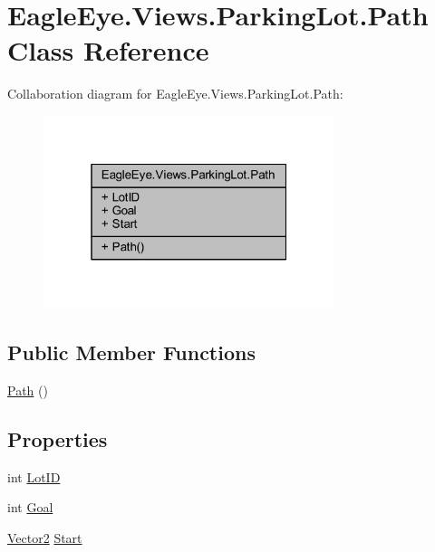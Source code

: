 \hypertarget{class_eagle_eye_1_1_views_1_1_parking_lot_1_1_path}{}\section{Eagle\+Eye.\+Views.\+Parking\+Lot.\+Path Class Reference}
\label{class_eagle_eye_1_1_views_1_1_parking_lot_1_1_path}


Collaboration diagram for Eagle\+Eye.\+Views.\+Parking\+Lot.\+Path\+:\nopagebreak
\begin{figure}[H]
\begin{center}
\leavevmode
\includegraphics[width=241pt]{class_eagle_eye_1_1_views_1_1_parking_lot_1_1_path__coll__graph}
\end{center}
\end{figure}
\subsection*{Public Member Functions}
\begin{DoxyCompactItemize}
\item 
\mbox{\hyperlink{class_eagle_eye_1_1_views_1_1_parking_lot_1_1_path_a4c3f78b3e3006e105cb17896213c3097}{Path}} ()
\end{DoxyCompactItemize}
\subsection*{Properties}
\begin{DoxyCompactItemize}
\item 
int \mbox{\hyperlink{class_eagle_eye_1_1_views_1_1_parking_lot_1_1_path_a84df41c093c7f5199a8029825f21a246}{Lot\+ID}}
\item 
int \mbox{\hyperlink{class_eagle_eye_1_1_views_1_1_parking_lot_1_1_path_a75f6434246c917b4dfc8b1e78e837c55}{Goal}}
\item 
\mbox{\hyperlink{class_eagle_eye_1_1_views_1_1_parking_lot_1_1_vector2}{Vector2}} \mbox{\hyperlink{class_eagle_eye_1_1_views_1_1_parking_lot_1_1_path_ab021d49dd55f3c76c2162882d296f873}{Start}}
\end{DoxyCompactItemize}


